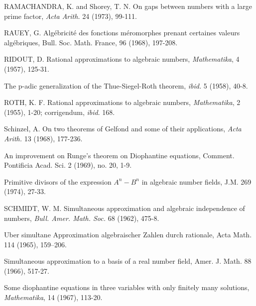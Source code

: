 \begin{hanglist}
    \item RAMACHANDRA, K. and Shorey, T. N. On gaps between numbers with a large prime factor, \textit{Acta Arith.} 24 (1973), 99-111.
    \item RAUEY, G. Algébricité des fonctions méromorphes prenant certaines valeurs algébriques, Bull. Soc. Math. France, 96 (1968), 197-208.
    \item RIDOUT, D. Rational approximations to algebraic numbers, \textit{Mathematika}, 4 (1957), 125-31.
    \item \hspace{1.5em} The p-adic generalization of the Thue-Siegel-Roth theorem, \textit{ibid.} 5 (1958), 40-8.
    \item ROTH, K. F. Rational approximations to algebraic numbers, \textit{Mathematika}, 2 (1955), 1-20; corrigendum, \textit{ibid}. 168.
    \item Schinzel, A. On two theorems of Gelfond and some of their applications, \textit{Acta Arith.} 13 (1968), 177-236.
    \item \hspace{1.5em} An improvement on Runge's theorem on Diophantine equations, Comment. Pontificia Acad. Sci. 2 (1969), no. 20, 1-9.
    \item \hspace{1.5em} Primitive divisors of the expression  $A^n-B^n$  in algebraic number fields, J.M. 269 (1974), 27-33.
    \item SCHMIDT, W. M. Simultaneous approximation and algebraic independence of numbers, \textit{Bull. Amer. Math. Soc.} 68 (1962), 475-8.
    \item \hspace{1.5em} Uber simultane Approximation algebraischer Zahlen durch rationale, Acta Math. 114 (1965), 159–206.
    \item \hspace{1.5em} Simultaneous approximation to a basis of a real number field, Amer. J. Math. 88 (1966), 517-27.
    \item \hspace{1.5em} Some diophantine equations in three variables with only finitely many solutions, \textit{Mathematika}, 14 (1967), 113-20.

\end{hanglist}
